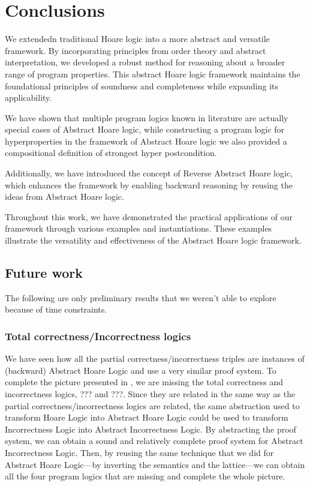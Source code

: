 \chapter{Conclusions}

We extendedn traditional Hoare logic into a more abstract and versatile 
framework. By incorporating principles from order theory and abstract 
interpretation, we developed a robust method for reasoning about a broader range 
of program properties. This abstract Hoare logic framework maintains the 
foundational principles of soundness and completeness while expanding its 
applicability.

We have shown that multiple program logics known in literature are actually 
special cases of Abstract Hoare logic, while constructing a program logic for 
hyperproperties in the framework of Abstract Hoare logic we also provided a 
compositional definition of strongest hyper postcondition.


Additionally, we have introduced the concept of Reverse Abstract Hoare logic, 
which enhances the framework by enabling backward reasoning by reusing the ideas
from Abstract Hoare logic. 

Throughout this work, we have demonstrated the practical applications of our 
framework through various examples and instantiations. These examples illustrate 
the versatility and effectiveness of the Abstract Hoare logic framework.

\section{Future work}
The following are only preliminary results that we weren't able to explore
because of time constraints.

\subsection{Total correctness/Incorrectness logics}
We have seen how all the partial correctness/incorrectness triples are
instances of (backward) Abstract Hoare Logic and use a very similar proof
system. To complete the picture presented in \cite{Zhang22}, we are missing the
total correctness and incorrectness logics, ??? and ???. Since they are related
in the same way as the partial correctness/incorrectness logics are related,
the same abstraction used to transform Hoare Logic into Abstract Hoare Logic
could be used to transform Incorrectness Logic \cite{Moller21} into Abstract
Incorrectness Logic. By abstracting the proof system, we can obtain a sound and
relatively complete proof system for Abstract Incorrectness Logic. Then, by
reusing the same technique that we did for Abstract Hoare Logic—by inverting
the semantics and the lattice—we can obtain all the four program logics that
are missing and complete the whole picture.

